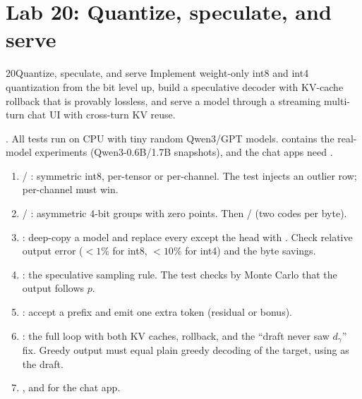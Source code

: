 \section{Lab 20: Quantize, speculate, and serve}\label{sec:efficient:lab}
\begin{labbox}{20}{Quantize, speculate, and serve}
Implement weight-only int8 and int4 quantization from the bit level up, build a
speculative decoder with KV-cache rollback that is provably lossless, and serve a model
through a streaming multi-turn chat UI with cross-turn KV reuse.

. All
tests run on CPU with tiny random Qwen3/GPT models.  contains the
real-model experiments (Qwen3-0.6B/1.7B snapshots), and the chat apps need
.

\begin{enumerate}
  \item {} / : symmetric int8, per-tensor or
        per-channel. The test injects an outlier row; per-channel must win.
  \item {} / : asymmetric 4-bit groups
        with zero points. Then  /  (two codes per byte).
  \item {}: deep-copy a model and replace every
         except the head with . Check relative
        output error ($<1\%$ for int8, $<10\%$ for int4) and the byte savings.
  \item {}: the speculative sampling rule. The test checks by
        Monte Carlo that the output follows $p$.
  \item {}: accept a prefix and emit one extra token (residual or bonus).
  \item {}: the full loop with both KV caches, rollback, and
        the ``draft never saw $d_\gamma$'' fix. Greedy output must equal plain greedy
        decoding of the target, using  as the draft.
  \item {}, and  for the chat app.
\end{enumerate}


\end{labbox}
